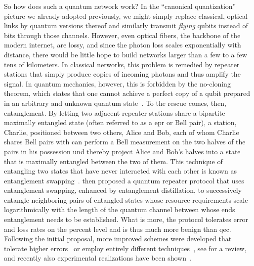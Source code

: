 So how does such a quantum network work?
In the \enquote{canonical quantization} picture we already adopted previously, we might simply replace classical, optical links by quantum versions thereof and similarly transmit \emph{flying} qubits instead of bits through those channels.
However, even optical fibers, the backbone of the modern internet, are lossy, and since the photon loss scales exponentially with distance, there would be little hope to build networks larger than a few to a few tens of kilometers.
In classical networks, this problem is remedied by repeater stations that simply produce copies of incoming photons and thus amplify the signal.
In quantum mechanics, however, this is forbidden by the no-cloning theorem, which states that one cannot achieve a perfect copy of a qubit prepared in an arbitrary and unknown quantum state~\cite{Wootters1982,Dieks1982}.
To the rescue comes, then, entanglement.
By letting two adjacent repeater stations share a bipartite maximally entangled state (often referred to as a \gls{epr} or Bell pair), a station, Charlie, positioned between two others, Alice and Bob, each of whom Charlie shares Bell pairs with can perform a Bell measurement on the two halves of the pairs in his possession und thereby project Alice and Bob's halves into a state that is maximally entangled between the two of them.
This technique of entangling two states that have never interacted with each other is known as entanglement swapping~\cite{Zukowski1993,Pan1998}.
\citet{Briegel1998,Dur1999} then proposed a quantum repeater protocol that uses entanglement swapping, enhanced by entanglement distillation,
to successively entangle neighboring pairs of entangled states whose resource requirements scale logarithmically with the length of the quantum channel between whose ends entanglement needs to be established.
What is more, the protocol tolerates error and loss rates on the percent level and is thus much more benign than \gls{qec}.
Following the initial proposal, more improved schemes were developed that tolerate higher errors~\cite{Dur2007} or employ entirely different techniques~\cite{Bayrakci2022}, see  for a review, and recently also experimental realizations have been shown~\cite{Krutyanskiy2023}.

